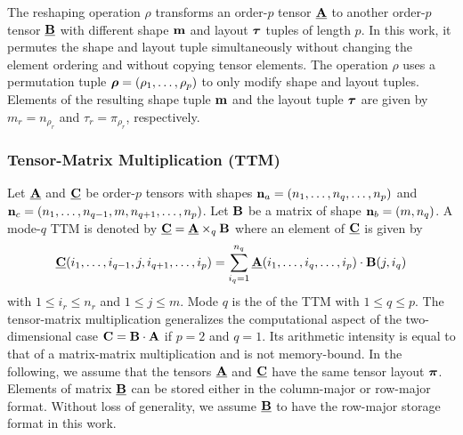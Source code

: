 The reshaping operation $\rho$ transforms an order-$p$ tensor $\underline{\mathbf{A}}$ to another order-$p$ tensor $\underline{\mathbf{B}}$ with different shape $\mathbf{m}$ and layout $\boldsymbol{\tau}$ tuples of length $p$.
In this work, it permutes the shape and layout tuple simultaneously without changing the element ordering and without copying tensor elements.
The operation $\rho$ uses a permutation tuple $\boldsymbol{\rho} = (\rho_1,\dots,\rho_p)$ to only modify shape and layout tuples.
Elements of the resulting shape tuple $\mathbf{m}$ and the layout tuple $\boldsymbol{\tau}$ are given by $m_r = n_{\rho_r}$ and $\tau_r = \pi_{\rho_r}$, respectively.
\vspace{-1em}

\subsubsection{Tensor-Matrix Multiplication (TTM)}
Let $\underline{\mathbf{A}}$ and $\underline{\mathbf{C}}$ be order-$p$ tensors with shapes $\mathbf{n}_a = (n_1,\dots,n_q,\dots,n_p)$ and $\mathbf{n}_c =(n_1,\dots,n_{q-1},m,n_{q+1},\dots,n_p)$. 
Let $\mathbf{B}$ be a matrix of shape $\mathbf{n}_b = (m,n_q)$.
A mode-$q$ TTM is denoted by $\underline{\mathbf{C}} = \underline{\mathbf{A}} \times_q \mathbf{B}$ where an element of $\underline{\mathbf{C}}$ is given by
\begin{equation}
\label{equ:tensor.matrix.multplication}
\underline{\mathbf{C}}(i_1, \dots, i_{q-1}, j, i_{q+1}, \dots, i_p) = \sum_{i_q=1}^{n_q} \underline{\mathbf{A}}(i_1, \dots, i_q, \dots, i_p) \cdot \mathbf{B}(j,i_q)
\end{equation}
with $1 \leq i_r \leq n_r$ and $1 \leq j \leq m$.
Mode $q$ is the   of the TTM  with $1 \leq q \leq p$.
The tensor-matrix multiplication generalizes the computational aspect of the two-dimensional case $\mathbf{C} = \mathbf{B} \cdot \mathbf{A}$ if $p=2$ and $q=1$.
Its arithmetic intensity is equal to that of a matrix-matrix multiplication and is not memory-bound.
In the following, we assume that the tensors $\underline{\mathbf{A}}$ and $\underline{\mathbf{C}}$ have the same tensor layout $\boldsymbol{\pi}$. 
Elements of matrix $\underline{\mathbf{B}}$ can be stored either in the column-major or row-major format.
Without loss of generality, we assume $\underline{\mathbf{B}}$ to have the row-major storage format in this work.
